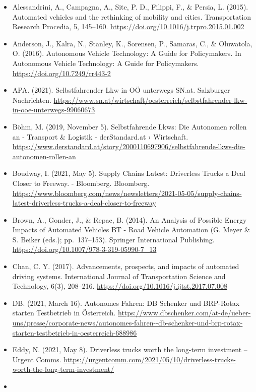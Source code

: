 \documentclass[
]{book}
\providecommand{\tightlist}{%
  \setlength{\itemsep}{0pt}\setlength{\parskip}{0pt}}
\begin{document}
\begin{itemize}
\tightlist
\item
  Alessandrini, A., Campagna, A., Site, P. D., Filippi, F., \& Persia, L. (2015). Automated vehicles and the rethinking of mobility and cities. Transportation Research Procedia, 5, 145--160. \url{https://doi.org/10.1016/j.trpro.2015.01.002}
\item
  Anderson, J., Kalra, N., Stanley, K., Sorensen, P., Samaras, C., \& Oluwatola, O. (2016). Autonomous Vehicle Technology: A Guide for Policymakers. In Autonomous Vehicle Technology: A Guide for Policymakers. \url{https://doi.org/10.7249/rr443-2}
\item
  APA. (2021). Selbstfahrender Lkw in OÖ unterwegs \textbar{} SN.at. Salzburger Nachrichten. \url{https://www.sn.at/wirtschaft/oesterreich/selbstfahrender-lkw-in-ooe-unterwegs-99060673}
\item
  Böhm, M. (2019, November 5). Selbstfahrende Lkws: Die Autonomen rollen an - Transport \& Logistik - derStandard.at › Wirtschaft. \url{https://www.derstandard.at/story/2000110697906/selbstfahrende-lkws-die-autonomen-rollen-an}
\item
  Boudway, I. (2021, May 5). Supply Chains Latest: Driverless Trucks a Deal Closer to Freeway. - Bloomberg. Bloomberg. \url{https://www.bloomberg.com/news/newsletters/2021-05-05/supply-chains-latest-driverless-trucks-a-deal-closer-to-freeway}
\item
  Brown, A., Gonder, J., \& Repac, B. (2014). An Analysis of Possible Energy Impacts of Automated Vehicles BT - Road Vehicle Automation (G. Meyer \& S. Beiker (eds.); pp.~137--153). Springer International Publishing. \url{https://doi.org/10.1007/978-3-319-05990-7_13}
\item
  Chan, C. Y. (2017). Advancements, prospects, and impacts of automated driving systems. International Journal of Transportation Science and Technology, 6(3), 208--216. \url{https://doi.org/10.1016/j.ijtst.2017.07.008}
\item
  DB. (2021, March 16). Autonomes Fahren: DB Schenker und BRP-Rotax starten Testbetrieb in Österreich. \url{https://www.dbschenker.com/at-de/ueber-uns/presse/corporate-news/autonomes-fahren--db-schenker-und-brp-rotax-starten-testbetrieb-in-oesterreich-688986}
\item
  Eddy, N. (2021, May 8). Driverless trucks worth the long-term investment -- Urgent Comms. \url{https://urgentcomm.com/2021/05/10/driverless-trucks-worth-the-long-term-investment/}
\item

\end{itemize}
\end{document}
